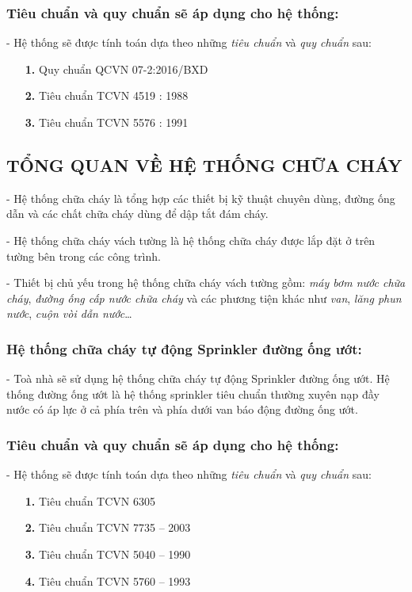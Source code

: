 	\subsubsection{Tiêu chuẩn và quy chuẩn sẽ áp dụng cho hệ thống:}
	\hspace{1cm}- Hệ thống sẽ được tính toán dựa theo những \emph{tiêu chuẩn} và \emph{quy chuẩn} sau:
	\begin{itemize}
		\setlength{\itemindent}{2cm}
		\item[\textbf{1.}]Quy chuẩn QCVN 07-2:2016/BXD
		\item[\textbf{2.}]Tiêu chuẩn TCVN 4519 : 1988
		\item[\textbf{3.}]Tiêu chuẩn TCVN 5576 : 1991
	\end{itemize}
	\subsection{TỔNG QUAN VỀ HỆ THỐNG CHỮA CHÁY}	
	- Hệ thống chữa cháy là tổng hợp các thiết bị kỹ thuật chuyên dùng, đường ống dẫn và các chất chữa cháy dùng để dập tắt đám cháy.
	
	- Hệ thống chữa cháy vách tường là hệ thống chữa cháy được lắp đặt ở trên tường bên trong các công trình.
	
	- Thiết bị chủ yếu trong hệ thống chữa cháy vách tường gồm: \emph{máy bơm nước chữa cháy}, \emph{đường ống cấp nước chữa cháy} và các phương tiện khác như \emph{van}, \emph{lăng phun nước}, \emph{cuộn vòi dẫn nước}…
	
	\subsubsection{Hệ thống chữa cháy tự động Sprinkler đường ống ướt:}
	- Toà nhà sẽ sử dụng hệ thống chữa cháy tự động Sprinkler đường ống ướt. Hệ thống đường ống ướt là hệ thống sprinkler tiêu chuẩn thường xuyên nạp đầy nước có áp lực ở cả phía trên và phía dưới van báo động đường ống ướt.
	\subsubsection{Tiêu chuẩn và quy chuẩn sẽ áp dụng cho hệ thống:}
	- Hệ thống sẽ được tính toán dựa theo những \emph{tiêu chuẩn} và \emph{quy chuẩn} sau:
	\begin{itemize}
		\setlength{\itemindent}{2cm}
		\item[\textbf{1.}]Tiêu chuẩn TCVN 6305 
		\item[\textbf{2.}]Tiêu chuẩn TCVN 7735 – 2003
		\item[\textbf{3.}]Tiêu chuẩn TCVN 5040 – 1990
		\item[\textbf{4.}]Tiêu chuẩn TCVN 5760 – 1993
	\end{itemize}
	
